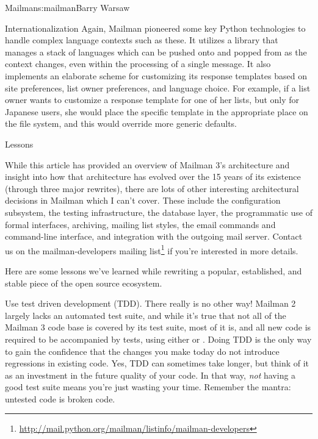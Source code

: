 \begin{aosachapter}{Mailman}{s:mailman}{Barry Warsaw}
\begin{aosasect1}{Internationalization}
Again, Mailman pioneered some key Python technologies to handle
complex language contexts such as these.  It utilizes a library that
manages a stack of languages which can be pushed onto and popped from
as the context changes, even within the processing of a single
message.  It also implements an elaborate scheme for customizing its
response templates based on site preferences, list owner preferences,
and language choice.  For example, if a list owner wants to customize
a response template for one of her lists, but only for Japanese users,
she would place the specific template in the appropriate place on the
file system, and this would override more generic defaults.

\end{aosasect1}

\begin{aosasect1}{Lessons}

While this article has provided an overview of Mailman 3's
architecture and insight into how that architecture has evolved over
the 15 years of its existence (through three major rewrites), there
are lots of other interesting architectural decisions in Mailman which
I can't cover.  These include the configuration subsystem, the testing
infrastructure, the database layer, the programmatic use of formal
interfaces, archiving, mailing list styles, the email commands and
command-line interface, and integration with the outgoing mail server.
Contact us on the mailman-developers mailing
list\footnote{\url{http://mail.python.org/mailman/listinfo/mailman-developers}}
if you're interested in more details.

Here are some lessons we've learned while rewriting a popular,
established, and stable piece of the open source ecosystem.

\begin{aosaitemize}

\item Use test driven development (TDD).  There really is no other
  way!  Mailman 2 largely lacks an automated test suite, and while
  it's true that not all of the Mailman 3 code base is covered by its
  test suite, most of it is, and all new code is required to be
  accompanied by tests, using either  or
  .  Doing TDD is the only way to gain the confidence
  that the changes you make today do not introduce regressions in
  existing code.  Yes, TDD can sometimes take longer, but think of it
  as an investment in the future quality of your code.  In that way,
  \emph{not} having a good test suite means you're just wasting your
  time.  Remember the mantra: untested code is broken code.


\end{aosaitemize}
\end{aosasect1}
\end{aosachapter}
